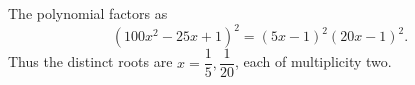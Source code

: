 The polynomial factors as
\[
(100x^2-25x+1)^2=(5x-1)^2(20x-1)^2.
\]
Thus the distinct roots are $\boxed{x=\dfrac{1}{5},\dfrac{1}{20}}$, each of multiplicity two.
